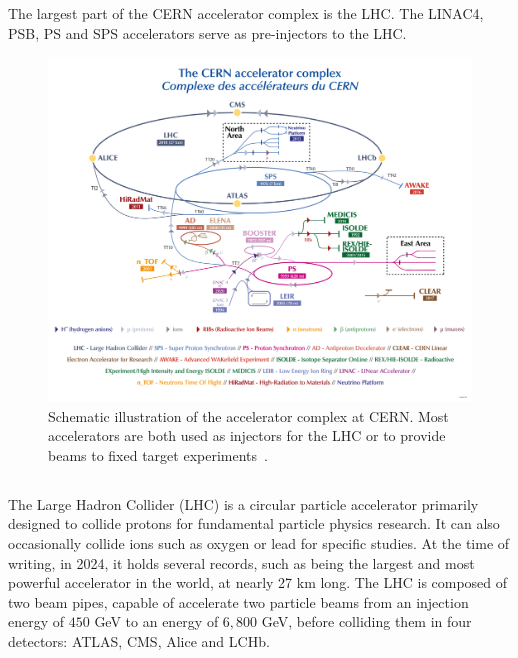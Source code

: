 The largest part of the CERN accelerator complex is the LHC. The LINAC4, PSB, PS and SPS
accelerators serve as pre-injectors to the LHC.

\begin{figure}[!htb]
    \centering
    \includegraphics[width=1\textwidth]{images/cern_complex.png}
    \caption{Schematic illustration of the accelerator complex at CERN. Most accelerators are both
    used as injectors for the LHC or to provide beams to fixed target
    experiments~\cite{noauthor_cern_2022}.}
    \label{fig:introduction:cern_complex}
\end{figure}


\subsection{}

The Large Hadron Collider (LHC) is a circular particle accelerator primarily designed to collide
protons for fundamental particle physics research. It can also occasionally collide ions such as
oxygen or lead for specific studies. At the time of writing, in 2024, it holds several records,
such as being the largest and most powerful accelerator in the world, at nearly 27 km long. The LHC
is composed of two beam pipes, capable of accelerate two particle beams from an injection energy
of $450$ GeV to an energy of $6,800$ GeV, before colliding them in four detectors: ATLAS, CMS, Alice
and LCHb.

